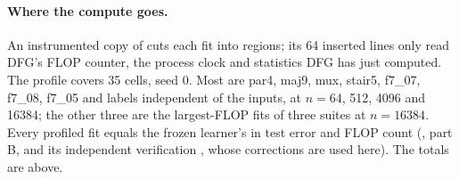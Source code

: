 \paragraph{Where the compute goes.} An instrumented copy of  cuts each fit into regions; its 64 inserted lines only read DFG's FLOP counter, the process clock and statistics DFG has just computed. The profile covers 35 cells, seed 0. Most are par4, maj9, mux, stair5, f7\_07, f7\_08, f7\_05 and labels independent of the inputs, at $n=64$, 512, 4096 and 16384; the other three are the largest-FLOP fits of three suites at $n=16384$. Every profiled fit equals the frozen learner's in test error and FLOP count (, part B, and its independent verification , whose corrections are used here). The totals are above.
